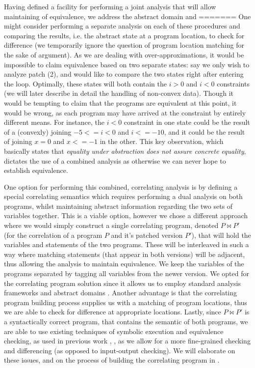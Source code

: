 Having defined a facility for performing a joint analysis that will allow maintaining of equivalence, we address the abstract domain and
=======
One might consider performing a separate analysis on each of these procedures and comparing the results, i.e. the abstract state at a program location, to check for difference (we temporarily ignore the question of program location matching for the sake of argument). As we are dealing with over-approximations, it would be impossible to claim equivalence based on two separate states: say we only wish to analyze patch (2), and would like to compare the two states right after entering the loop. Optimally, these states will both contain the ${i > 0}$ and ${i < 0}$ constraints (we will later describe in detail the handling of non-convex data). Though it would be tempting to claim that the programs are equivalent at this point, it would be wrong, as each program may have arrived at the constraint by entirely different means. For instance, the ${i < 0}$ constraint in one state could be the result of a (convexly) joining ${-5<=i<0}$ and ${i<=-10}$, and it could be the result of joining ${x=0}$ and ${x<=-1}$ in the other. This key observation, which basically states that \emph{equality under abstraction does not assure concrete equality}, dictates the use of a combined analysis as otherwise we can never hope to establish equivalence.

One option for performing this combined, correlating analysis is by defining a special correlating semantics which requires performing a dual analysis on both programs, whilst maintaining abstract information regarding the two sets of variables together. This is a viable option, however we chose a different approach where we would simply construct a single correlating program, denoted $P \bowtie P'$ (for the correlation of a program $P$ and it's patched version $P'$), that will hold the variables and statements of the two programs. These will be interleaved in such a way where matching statements (that appear in both versions) will be adjacent, thus allowing the analysis to maintain equivalence. We keep the variables of the programs separated by tagging all variables from the newer version. We opted for the correlating program solution since it allows us to employ standard analysis frameworks \cite{CLang} and abstract domains \cite{JeannetMine09}. Another advantage is that the correlating program building process supplies us with a matching of program locations, thus we are able to check for difference at appropriate locations. Lastly, since $P \bowtie P'$ is a syntactically correct program, that contains the semantic of both programs, we are able to use existing techniques of symbolic execution and equivalence checking, as used in previous work \cite{GodlinStrichman09,DwyerElbaumPerson08,EnglerRamos11}, , as we allow for a more fine-grained checking and differencing (as opposed to input-output checking). We will elaborate on these issues, and on the process of building the correlating program in .

